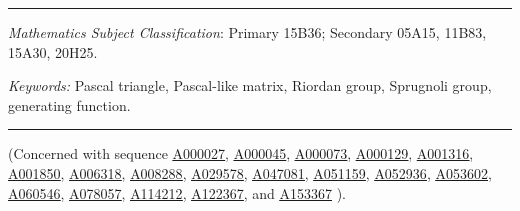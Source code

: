 \documentclass[12pt,reqno]{article}
\theoremstyle{definition}
\newcommand{\seqnum}[1]{\href{http://oeis.org/#1}{\underline{#1}}}
\begin{document}
\bigskip
\hrule
\bigskip
{} {\it Mathematics Subject Classification}:
Primary 15B36; Secondary 05A15, 11B83, 15A30, 20H25.

\noindent \emph{Keywords:} Pascal triangle, Pascal-like matrix, Riordan group, Sprugnoli group, generating function.



\bigskip
\hrule
\bigskip
\noindent (Concerned with sequence
\seqnum{A000027},
\seqnum{A000045},
\seqnum{A000073},
\seqnum{A000129},
\seqnum{A001316},
\seqnum{A001850},
\seqnum{A006318},
\seqnum{A008288},
\seqnum{A029578},
\seqnum{A047081},
\seqnum{A051159},
\seqnum{A052936},
\seqnum{A053602},
\seqnum{A060546},
\seqnum{A078057},
\seqnum{A114212},
\seqnum{A122367}, and
\seqnum{A153367}
).
\end{document}
